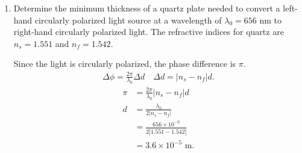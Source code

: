 \documentclass{zc-ust-hw}
\begin{document}
\maketitle

\begin{enumerate}

  \item Determine the minimum thickness of a quartz plate needed to convert a
    left-hand circularly polarized light source at a wavelength of $\lambda_0 = 656$ nm
    to right-hand circularly polarized light. The refractive indices for quartz
    are $n_s = 1.551$ and $n_f = 1.542$.
    \begin{sol}
      Since the light is circularly polarized, the phase difference is $\pi$.
      \begin{align}
        \Delta\phi = \frac{2\pi}{\lambda_0} \Delta d \quad \Delta d = |n_s - n_f|d
      .\end{align}
      \begin{align}
        \pi &= \frac{2\pi}{\lambda_0} |n_s - n_f|d \\
        d &= \frac{\lambda_0}{2|n_s - n_f|} \\
          &= \frac{656 \times 10^{-9}}{2|1.551 - 1.542|} \\
          &= 3.6 \times 10^{-5} \text{ m}
      .\end{align}
    \end{sol}
  

\end{enumerate}
\end{document}

